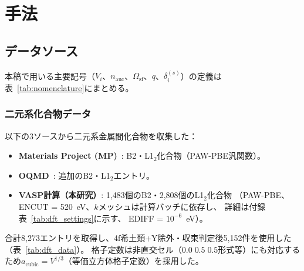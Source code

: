 \documentclass[5p,10pt]{elsarticle}
\begin{document}
\section{手法}
\label{sec:method}

\subsection{データソース}
\label{sec:data}

本稿で用いる主要記号（$V_i$、$n_\text{auc}$、$\Omega_\text{sf}$、$q$、$\delta_i^{(s)}$）の定義は表~\ref{tab:nomenclature}にまとめる。

\subsubsection{二元系化合物データ}
以下の3ソースから二元系金属間化合物を収集した：
\begin{itemize}
  \item \textbf{Materials Project (MP)}~\cite{Jain2013}:
    B2・L1$_2$化合物（PAW-PBE汎関数）。
  \item \textbf{OQMD}~\cite{Saal2013}:
    追加のB2・L1$_2$エントリ。
  \item \textbf{VASP計算（本研究）}:
    1,483個のB2・2,808個のL1$_2$化合物
    （PAW-PBE、ENCUT = 520~eV、$k$メッシュは計算バッチに依存し、
    詳細は付録表~\ref{tab:dft_settings}に示す、
    EDIFF = $10^{-6}$~eV）。
\end{itemize}
合計8,273エントリを取得し、4f希土類+Y除外・収束判定後5,152件を使用した（表~\ref{tab:dft_data}）。
格子定数は非直交セル（$0.0\;0.5\;0.5$形式等）にも対応するため$a_\text{cubic} = V^{1/3}$（等価立方体格子定数）を採用した。
\end{document}
